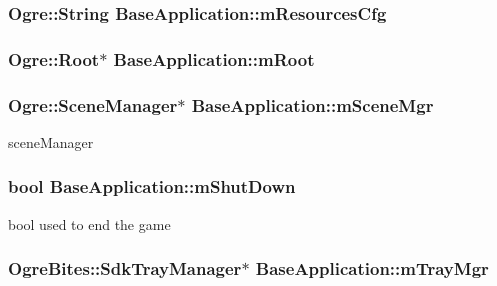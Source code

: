 \hypertarget{class_base_application_a765e0df01c141a16df3178ab4f17afe6}{
\subsubsection[{m\-Resources\-Cfg}]{\setlength{\rightskip}{0pt plus 5cm}Ogre\-::\-String Base\-Application\-::m\-Resources\-Cfg\hspace{0.3cm}{\ttfamily [protected]}}}\label{class_base_application_a765e0df01c141a16df3178ab4f17afe6}
\hypertarget{class_base_application_add84ba707dc6c57e6283f214b1274110}{
\subsubsection[{m\-Root}]{\setlength{\rightskip}{0pt plus 5cm}Ogre\-::\-Root$\ast$ Base\-Application\-::m\-Root\hspace{0.3cm}{\ttfamily [protected]}}}\label{class_base_application_add84ba707dc6c57e6283f214b1274110}
\hypertarget{class_base_application_a8a7684f4f9a57ed3089048ad1a913b2d}{
\subsubsection[{m\-Scene\-Mgr}]{\setlength{\rightskip}{0pt plus 5cm}Ogre\-::\-Scene\-Manager$\ast$ Base\-Application\-::m\-Scene\-Mgr\hspace{0.3cm}{\ttfamily [protected]}}}\label{class_base_application_a8a7684f4f9a57ed3089048ad1a913b2d}
scene\-Manager \hypertarget{class_base_application_a755f26d3a9915aaf830750d877e39d86}{
\subsubsection[{m\-Shut\-Down}]{\setlength{\rightskip}{0pt plus 5cm}bool Base\-Application\-::m\-Shut\-Down\hspace{0.3cm}{\ttfamily [protected]}}}\label{class_base_application_a755f26d3a9915aaf830750d877e39d86}
bool used to end the game \hypertarget{class_base_application_a7faa397f4f4861ee8c361a01e90b4416}{
\subsubsection[{m\-Tray\-Mgr}]{\setlength{\rightskip}{0pt plus 5cm}Ogre\-Bites\-::\-Sdk\-Tray\-Manager$\ast$ Base\-Application\-::m\-Tray\-Mgr\hspace{0.3cm}{\ttfamily [protected]}}}\label{class_base_application_a7faa397f4f4861ee8c361a01e90b4416}
